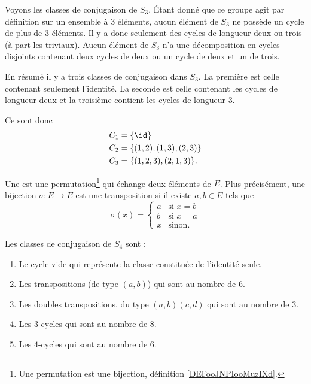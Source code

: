 \begin{example}     \label{EXooQAXRooBsPURs}
	Voyons les classes de conjugaison de \( S_3\). Étant donné que ce groupe agit par définition sur un ensemble à \( 3\) éléments, aucun élément de \( S_3\) ne possède un cycle de plus de \( 3\) éléments. Il y a donc seulement des cycles de longueur deux ou trois (à part les triviaux). Aucun élément de \( S_3\) n'a une décomposition en cycles disjoints contenant deux cycles de deux ou un cycle de deux et un de trois.

	En résumé il y a trois classes de conjugaison dans \( S_3\). La première est celle contenant seulement l'identité. La seconde est celle contenant les cycles de longueur deux et la troisième contient les cycles de longueur \( 3\).

	Ce sont donc
	\begin{subequations}
		\begin{align}
			C_1 & =\{ \id \}               \\
			C_2 & =\{ (1,2),(1,3),(2,3) \} \\
			C_3 & =\{ (1,2,3),(2,1,3) \}.
		\end{align}
	\end{subequations}
\end{example}

\begin{definition}[transposition]      \label{DEFooXNAFooGTbTTJ}
	Une  est une permutation\footnote{Une permutation est une bijection, définition \ref{DEFooJNPIooMuzIXd}.} qui échange deux éléments de \( E\). Plus précisément, une bijection \( \sigma\colon E\to E\) est une transposition si il existe \( a,b\in E\) tels que
	\begin{equation}
		\sigma(x)=\begin{cases}
			a & \text{si } x=b \\
			b & \text{si } x=a \\
			x & \text{sinon. }
		\end{cases}
	\end{equation}
\end{definition}


\begin{proposition}	\label{PROPooQRZYooKVZTCJ}
	Les classes de conjugaison de \( S_4\) sont :
	\begin{enumerate}
		\item		\label{ITEMooZIYYooCqpicx}
		      Le cycle vide qui représente la classe constituée de l'identité seule.
		\item \label{ITEMooVDLGooFOkgzc}
		      Les transpositions (de type \( (a,b)\)) qui sont au nombre de \( 6\).
		\item       \label{ITEMooGCMYooKZgFHX}
		      Les doubles transpositions, du type \( (a,b)(c,d)\) qui sont au nombre de \( 3\).
		\item		\label{ITEMooMHRWooSkUveJ}
		      Les \( 3\)-cycles qui sont au nombre de \( 8\).
		\item		\label{ITEMooCBYNooZmFsBd}
		      Les \( 4\)-cycles qui sont au nombre de \( 6\).
	\end{enumerate}
\end{proposition}

